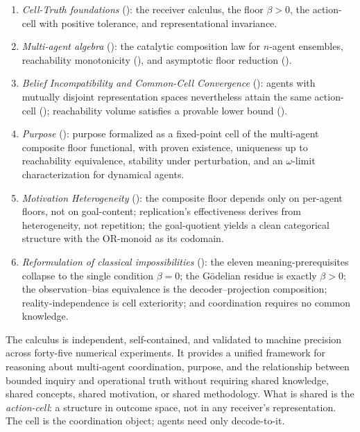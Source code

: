 \documentclass[11pt,twocolumn,a4paper]{article}
\begin{document}
\begin{enumerate}[label=(\arabic*),leftmargin=*]
\item \emph{Cell-Truth foundations} (): the
receiver calculus, the floor $\beta>0$, the action-cell with positive
tolerance, and representational invariance.
\item \emph{Multi-agent algebra} (): the
catalytic composition law for $n$-agent ensembles, reachability
monotonicity (), and asymptotic floor reduction
().
\item \emph{Belief Incompatibility and Common-Cell Convergence}
(): agents with mutually
disjoint representation spaces nevertheless attain the same
action-cell (); reachability volume satisfies a
provable lower bound ().
\item \emph{Purpose} ():
purpose formalized as a fixed-point cell of the multi-agent composite
floor functional, with proven existence, uniqueness up to reachability
equivalence, stability under perturbation, and an $\omega$-limit
characterization for dynamical agents.
\item \emph{Motivation Heterogeneity} ():
the composite floor depends only on per-agent floors, not on
goal-content; replication's effectiveness derives from heterogeneity,
not repetition; the goal-quotient yields a clean
categorical structure with the OR-monoid as its codomain.
\item \emph{Reformulation of classical impossibilities}
():
the eleven meaning-prerequisites collapse to the single condition
$\beta=0$; the Gödelian residue is exactly $\beta>0$; the
observation--bias equivalence is the decoder--projection
composition; reality-independence is cell exteriority; and
coordination requires no common knowledge.
\end{enumerate}

The calculus is independent, self-contained, and validated to machine
precision across forty-five numerical experiments. It provides a
unified framework for reasoning about multi-agent coordination,
purpose, and the relationship between bounded inquiry and operational
truth without requiring shared knowledge, shared concepts,
shared motivation, or shared methodology. What is shared is the
\emph{action-cell}: a structure in outcome space, not in any
receiver's representation. The cell is the coordination object;
agents need only decode-to-it.



\end{document}
